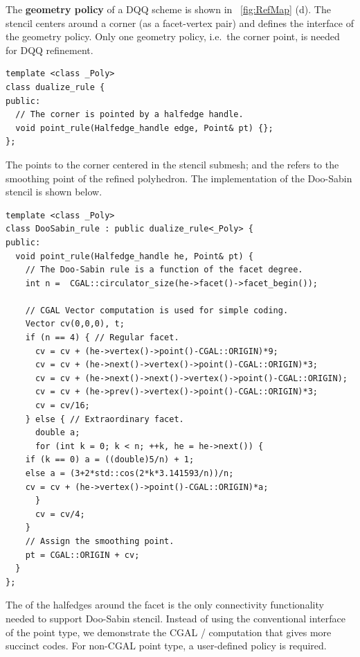 \noindent The \textbf{geometry policy} of a DQQ scheme is shown in
\figurename\ \ref{fig:RefMap} (d). The stencil centers around
a corner (as a facet-vertex pair) and defines the interface 
of the geometry policy. Only one geometry policy, i.e.\ the corner 
point, is needed for DQQ refinement. 
\begin{lstlisting}
template <class _Poly>
class dualize_rule {
public:
  // The corner is pointed by a halfedge handle.
  void point_rule(Halfedge_handle edge, Point& pt) {};
};
\end{lstlisting}
The  points to the 
corner centered in the stencil submesh; and the 
 refers to the smoothing point
of the refined polyhedron. The implementation of the
Doo-Sabin stencil is shown below.
\begin{lstlisting}
template <class _Poly>
class DooSabin_rule : public dualize_rule<_Poly> {
public:
  void point_rule(Halfedge_handle he, Point& pt) {
    // The Doo-Sabin rule is a function of the facet degree.
    int n =  CGAL::circulator_size(he->facet()->facet_begin());

    // CGAL Vector computation is used for simple coding.
    Vector cv(0,0,0), t;
    if (n == 4) { // Regular facet.
      cv = cv + (he->vertex()->point()-CGAL::ORIGIN)*9;
      cv = cv + (he->next()->vertex()->point()-CGAL::ORIGIN)*3;
      cv = cv + (he->next()->next()->vertex()->point()-CGAL::ORIGIN);
      cv = cv + (he->prev()->vertex()->point()-CGAL::ORIGIN)*3;
      cv = cv/16;
    } else { // Extraordinary facet.
      double a;
      for (int k = 0; k < n; ++k, he = he->next()) {
	if (k == 0) a = ((double)5/n) + 1;
	else a = (3+2*std::cos(2*k*3.141593/n))/n;
	cv = cv + (he->vertex()->point()-CGAL::ORIGIN)*a;
      }
      cv = cv/4;
    }
    // Assign the smoothing point.
    pt = CGAL::ORIGIN + cv;
  }
};
\end{lstlisting}
The  of the halfedges around the 
facet is the only connectivity functionality needed 
to support Doo-Sabin stencil. 
Instead of using the conventional interface \CodeFmt{[i]} 
of the point type, we demonstrate the CGAL 
/ computation that gives
more succinct codes. For non-CGAL point type, a user-defined 
policy is required. 
\\


